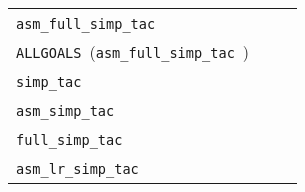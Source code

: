 \begin{isabellebody}
\begin{isamarkuptext}
  \medskip
  \begin{tabular}{lll}
    \verb|asm_full_simp_tac|~\isa{{\isaliteral{22}{\isachardoublequote}}{\isaliteral{40}{\isacharat}}{\isaliteral{7B}{\isacharbraceleft}}simpset{\isaliteral{7D}{\isacharbraceright}}\ {\isadigit{1}}{\isaliteral{22}{\isachardoublequote}}} & & \hyperlink{method.simp}{\mbox{\isa{simp}}} \\
    \verb|ALLGOALS|~(\verb|asm_full_simp_tac|~\isa{{\isaliteral{22}{\isachardoublequote}}{\isaliteral{40}{\isacharat}}{\isaliteral{7B}{\isacharbraceleft}}simpset{\isaliteral{7D}{\isacharbraceright}}{\isaliteral{22}{\isachardoublequote}}}) & & \hyperlink{method.simp-all}{\mbox{\isa{simp{\isaliteral{5F}{\isacharunderscore}}all}}} \\[0.5ex]
    \verb|simp_tac|~\isa{{\isaliteral{22}{\isachardoublequote}}{\isaliteral{40}{\isacharat}}{\isaliteral{7B}{\isacharbraceleft}}simpset{\isaliteral{7D}{\isacharbraceright}}\ {\isadigit{1}}{\isaliteral{22}{\isachardoublequote}}} & & \hyperlink{method.simp}{\mbox{\isa{simp}}}~\isa{{\isaliteral{22}{\isachardoublequote}}{\isaliteral{28}{\isacharparenleft}}no{\isaliteral{5F}{\isacharunderscore}}asm{\isaliteral{29}{\isacharparenright}}{\isaliteral{22}{\isachardoublequote}}} \\
    \verb|asm_simp_tac|~\isa{{\isaliteral{22}{\isachardoublequote}}{\isaliteral{40}{\isacharat}}{\isaliteral{7B}{\isacharbraceleft}}simpset{\isaliteral{7D}{\isacharbraceright}}\ {\isadigit{1}}{\isaliteral{22}{\isachardoublequote}}} & & \hyperlink{method.simp}{\mbox{\isa{simp}}}~\isa{{\isaliteral{22}{\isachardoublequote}}{\isaliteral{28}{\isacharparenleft}}no{\isaliteral{5F}{\isacharunderscore}}asm{\isaliteral{5F}{\isacharunderscore}}simp{\isaliteral{29}{\isacharparenright}}{\isaliteral{22}{\isachardoublequote}}} \\
    \verb|full_simp_tac|~\isa{{\isaliteral{22}{\isachardoublequote}}{\isaliteral{40}{\isacharat}}{\isaliteral{7B}{\isacharbraceleft}}simpset{\isaliteral{7D}{\isacharbraceright}}\ {\isadigit{1}}{\isaliteral{22}{\isachardoublequote}}} & & \hyperlink{method.simp}{\mbox{\isa{simp}}}~\isa{{\isaliteral{22}{\isachardoublequote}}{\isaliteral{28}{\isacharparenleft}}no{\isaliteral{5F}{\isacharunderscore}}asm{\isaliteral{5F}{\isacharunderscore}}use{\isaliteral{29}{\isacharparenright}}{\isaliteral{22}{\isachardoublequote}}} \\
    \verb|asm_lr_simp_tac|~\isa{{\isaliteral{22}{\isachardoublequote}}{\isaliteral{40}{\isacharat}}{\isaliteral{7B}{\isacharbraceleft}}simpset{\isaliteral{7D}{\isacharbraceright}}\ {\isadigit{1}}{\isaliteral{22}{\isachardoublequote}}} & & \hyperlink{method.simp}{\mbox{\isa{simp}}}~\isa{{\isaliteral{22}{\isachardoublequote}}{\isaliteral{28}{\isacharparenleft}}asm{\isaliteral{5F}{\isacharunderscore}}lr{\isaliteral{29}{\isacharparenright}}{\isaliteral{22}{\isachardoublequote}}} \\

\end{tabular}
\end{isamarkuptext}
\end{isabellebody}
